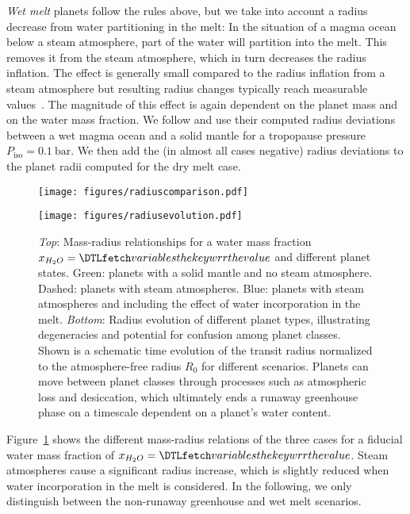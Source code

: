 \documentclass[modern]{aastex631}
\begin{document}
\textit{Wet melt} planets follow the rules above, but we take into account a radius decrease from water partitioning in the melt:
In the situation of a magma ocean below a steam atmosphere, part of the water will partition into the melt.
This removes it from the steam atmosphere, which in turn decreases the radius inflation.
The effect is generally small compared to the radius inflation from a steam atmosphere but resulting radius changes typically reach measurable values~\citep{Dorn2021}.
The magnitude of this effect is again dependent on the planet mass and on the water mass fraction.
We follow \citet{Dorn2021} and use their computed radius deviations between a wet magma ocean and a solid mantle for a tropopause pressure~$P_\mathrm{iso}=\SI{0.1}{\bar}$.
We then add the (in almost all cases negative) radius deviations to the planet radii computed for the dry melt case.

\begin{figure}
    \begin{centering}
        \texttt{[image: figures/radiuscomparison.pdf]}
    \end{centering}
    \begin{centering}
        \texttt{[image: figures/radiusevolution.pdf]}
        \caption{
            \textit{Top}: Mass-radius relationships for a water mass fraction $x_{H_2O}= \var{wrr}$ and different planet states. Green: planets with a solid mantle and no steam atmosphere. Dashed: planets with steam atmospheres. Blue: planets with steam atmospheres and including the effect of water incorporation in the melt.
            \textit{Bottom}: Radius evolution of different planet types, illustrating degeneracies and potential for confusion among planet classes. Shown is a schematic time evolution of the transit radius normalized to the atmosphere-free radius $R_\mathrm{0}$ for different scenarios. Planets can move between planet classes through processes such as atmospheric loss and desiccation, which ultimately ends a runaway greenhouse phase on a timescale dependent on a planet's water content.}
        \label{fig:radiusevolution}
    \end{centering}
\end{figure}
Figure~\ref{fig:radiusevolution} shows the different mass-radius relations of the three cases for a fiducial water mass fraction of $x_{H_2O}= \var{wrr}$.
Steam atmospheres cause a significant radius increase, which is slightly reduced when water incorporation in the melt is considered.
In the following, we only distinguish between the non-runaway greenhouse and wet melt scenarios.
\end{document}
